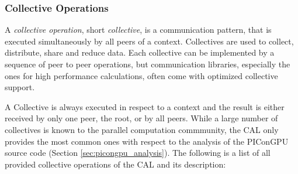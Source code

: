 \subsubsection{Collective Operations}
\label{sec:cal_collective}
A \textit{collective operation}, short \textit{collective}, is a
communication pattern, that is executed simultaneously by all peers of
a context. Collectives are used to collect, distribute, share and
reduce data.  Each collective can be implemented by a sequence of peer
to peer operations, but communication libraries, especially the ones for
high performance calculations, often come with optimized collective support.

A Collective is always executed in respect to a context and the result
is either received by only one peer, the root, or by all peers.  While
a large number of collectives is known to the parallel computation
commmunity, the CAL only provides the most common ones with respect to
the analysis of the PIConGPU source code (Section
\ref{sec:picongpu_analysis}).  The following is a list of all provided
collective operations of the CAL and its description:


